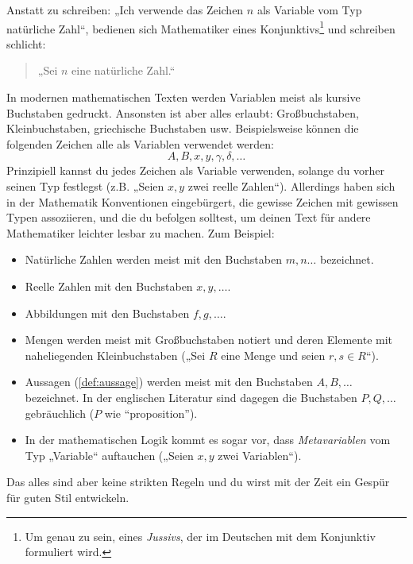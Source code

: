 \begin{nota}
    Anstatt zu schreiben: „Ich verwende das Zeichen $n$ als Variable vom Typ natürliche Zahl“, bedienen sich Mathematiker eines Konjunktivs\footnote{Um genau zu sein, eines \emph{Jussivs}, der im Deutschen mit dem Konjunktiv formuliert wird.} und schreiben schlicht:
    \begin{quote}
        „Sei $n$ eine natürliche Zahl.“
    \end{quote}
    In modernen mathematischen Texten werden Variablen meist als kursive Buchstaben gedruckt. Ansonsten ist aber alles erlaubt: Großbuchstaben, Kleinbuchstaben, griechische Buchstaben usw. Beispielsweise können die folgenden Zeichen alle als Variablen verwendet werden:
        \[ A,B,x,y,\gamma,\delta,\dots \]
    Prinzipiell kannst du jedes Zeichen als Variable verwenden, solange du vorher seinen Typ festlegst (z.B. „Seien $x,y$ zwei reelle Zahlen“). Allerdings haben sich in der Mathematik Konventionen eingebürgert, die gewisse Zeichen mit gewissen Typen assoziieren, und die du befolgen solltest, um deinen Text für andere Mathematiker leichter lesbar zu machen. Zum Beispiel:
    \begin{itemize}
        \item Natürliche Zahlen werden meist mit den Buchstaben $m,n\dots$ bezeichnet.
        \item Reelle Zahlen mit den Buchstaben $x,y,\dots$.
        \item Abbildungen mit den Buchstaben $f,g,\dots$.
        \item Mengen werden meist mit Großbuchstaben notiert und deren Elemente mit naheliegenden Kleinbuchstaben („Sei $R$ eine Menge und seien $r,s\in R$“).
        \item Aussagen (\cref{def:aussage}) werden meist mit den Buchstaben $A,B,\dots$ bezeichnet. In der englischen Literatur sind dagegen die Buchstaben $P,Q,\dots$ gebräuchlich ($P$ wie ``proposition'').
        \item In der mathematischen Logik kommt es sogar vor, dass \emph{Metavariablen} vom Typ „Variable“ auftauchen („Seien $x,y$ zwei Variablen“).
    \end{itemize}
    Das alles sind aber keine strikten Regeln und du wirst mit der Zeit ein Gespür für guten Stil entwickeln.
\end{nota}


